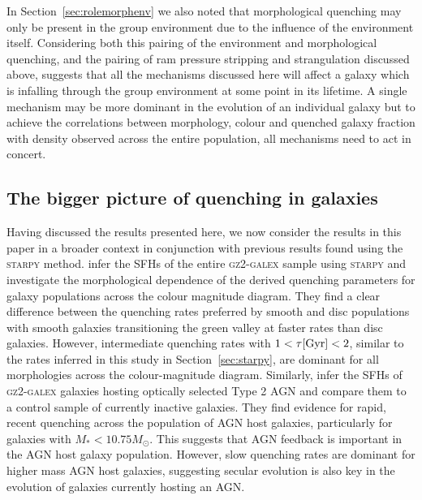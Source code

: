 \documentclass[useAMS,usenatbib]{mn2e}
\begin{document}
In Section~\ref{sec:rolemorphenv} we also noted that morphological quenching may only be present in the group environment due to the influence of the environment itself. Considering both this pairing of the environment and morphological quenching, and the pairing of ram pressure stripping and strangulation discussed above, suggests that all the mechanisms discussed here will affect a galaxy which is infalling through the group environment at some point in its lifetime. A single mechanism may be more dominant in the evolution of an individual galaxy but to achieve the correlations between morphology, colour and quenched galaxy fraction with density observed across the entire population, all mechanisms need to act in concert.  

\subsection{The bigger picture of quenching in galaxies}\label{sec:bigpic}

Having discussed the results presented here, we now consider the results in this paper in a broader context in conjunction with previous results found using the \textsc{starpy} method. \cite{smethurst15} infer the SFHs of the entire \textsc{gz2-galex} sample using \textsc{starpy} and investigate the morphological dependence of the derived quenching parameters for galaxy populations across the colour magnitude diagram. They find a clear difference between the quenching rates preferred by smooth and disc populations with smooth galaxies transitioning the green valley at faster rates than disc galaxies. However, intermediate quenching rates with $1 < \tau \rm{[Gyr]} < 2$, similar to the rates inferred in this study in Section~\ref{sec:starpy}, are dominant for all morphologies across the colour-magnitude diagram. Similarly, \cite{smethurst16} infer the SFHs of \textsc{gz2-galex} galaxies hosting optically selected Type 2 AGN and compare them to a control sample of currently inactive galaxies. They find evidence for rapid, recent quenching across the population of AGN host galaxies, particularly for galaxies with $M_* < 10.75 M_{\odot}$. This suggests that AGN feedback is important in the AGN host galaxy population. However, slow quenching rates are dominant for higher mass AGN host galaxies, suggesting secular evolution is also key in the evolution of galaxies currently hosting an AGN.  

\end{document}
